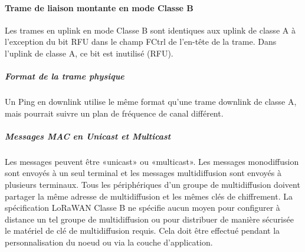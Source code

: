 \documentclass[11pt]{article}
\begin{document}
\paragraph{Trame de liaison montante en mode Classe B}
Les trames en uplink en mode Classe B sont identiques aux uplink de classe A à l'exception du bit RFU dans le champ FCtrl de l'en-tête de la trame. Dans l'uplink de classe A, ce bit est inutilisé (RFU). 
\subparagraph{Format de la trame physique}
Un Ping en downlink utilise le même format qu'une trame downlink de classe A, mais pourrait suivre un plan de fréquence de canal différent.
\subparagraph{Messages MAC en Unicast et Multicast}
Les messages peuvent être «unicast» ou «multicast». Les messages monodiffusion sont envoyés à un seul terminal et les messages multidiffusion sont envoyés à plusieurs terminaux. Tous les périphériques d'un groupe de multidiffusion doivent partager la même adresse de multidiffusion et les mêmes clés de chiffrement. La spécification LoRaWAN Classe B ne spécifie aucun moyen pour configurer à distance un tel groupe de multidiffusion ou pour distribuer de manière sécurisée le matériel de clé de multidiffusion requis. Cela doit être effectué pendant la personnalisation du noeud ou via la couche d'application.
\end{document}

